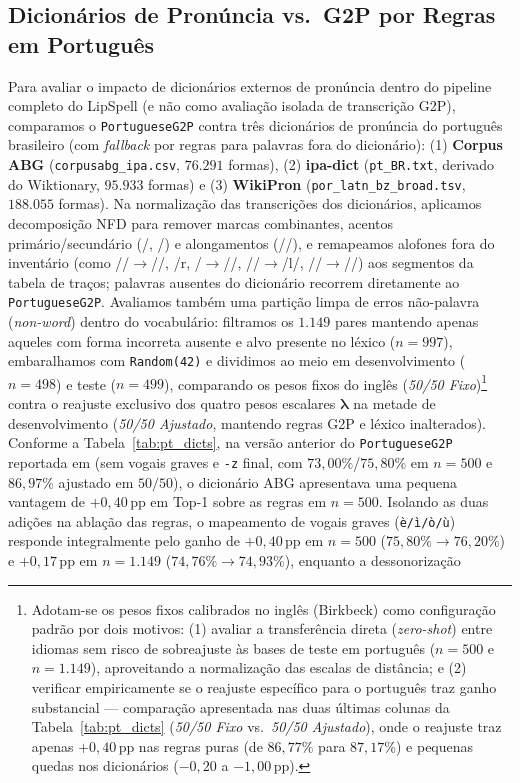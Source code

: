 \documentclass[a4paper, twocolumn, 11pt, twoside]{article}
\begin{document}
\subsection{Dicionários de Pronúncia vs.\ G2P por Regras em Português}
\label{sec:pt_dicts}
Para avaliar o impacto de dicionários externos de pronúncia dentro do pipeline completo do LipSpell (e não como avaliação isolada de transcrição G2P), comparamos o \texttt{PortugueseG2P} contra três dicionários de pronúncia do português brasileiro (com \textit{fallback} por regras para palavras fora do dicionário): (1) \textbf{Corpus ABG} \citep{benevides2017abg} (\texttt{corpusabg\_ipa.csv}, $76.291$ formas), (2) \textbf{ipa-dict} \citep{opendictipadict} (\texttt{pt\_BR.txt}, derivado do Wiktionary, $95.933$ formas) e (3) \textbf{WikiPron} \citep{lee2020wikipron} (\texttt{por\_latn\_bz\_broad.tsv}, $188.055$ formas). Na normalização das transcrições dos dicionários, aplicamos decomposição NFD para remover marcas combinantes, acentos primário/secundário (/\textprimstress, \textsecstress/) e alongamentos (/\textlengthmark/), e remapeamos alofones fora do inventário (como /\textinvscr/$\rightarrow$/\textturnr/, /r, /$\rightarrow$/\textfishhookr/, /\textltilde/$\rightarrow$/l/, /\textgamma/$\rightarrow$//) aos segmentos da tabela de traços; palavras ausentes do dicionário recorrem diretamente ao \texttt{PortugueseG2P}. Avaliamos também uma partição limpa de erros não-palavra (\textit{non-word}) dentro do vocabulário: filtramos os $1.149$ pares mantendo apenas aqueles com forma incorreta ausente e alvo presente no léxico ($n=997$), embaralhamos com \texttt{Random(42)} e dividimos ao meio em desenvolvimento ($n=498$) e teste ($n=499$), comparando os pesos fixos do inglês (\textit{50/50 Fixo})\footnote{Adotam-se os pesos fixos calibrados no inglês (Birkbeck) como configuração padrão por dois motivos: (1) avaliar a transferência direta (\textit{zero-shot}) entre idiomas sem risco de sobreajuste às bases de teste em português ($n=500$ e $n=1.149$), aproveitando a normalização das escalas de distância; e (2) verificar empiricamente se o reajuste específico para o português traz ganho substancial --- comparação apresentada nas duas últimas colunas da Tabela~\ref{tab:pt_dicts} (\textit{50/50 Fixo} vs.\ \textit{50/50 Ajustado}), onde o reajuste traz apenas $+0{,}40$\,pp nas regras puras (de $86{,}77\%$ para $87{,}17\%$) e pequenas quedas nos dicionários ($-0{,}20$ a $-1{,}00$\,pp).} contra o reajuste exclusivo dos quatro pesos escalares $\boldsymbol{\lambda}$ na metade de desenvolvimento (\textit{50/50 Ajustado}, mantendo regras G2P e léxico inalterados). Conforme a Tabela~\ref{tab:pt_dicts}, na versão anterior do \texttt{PortugueseG2P} reportada em \citet{araujo2026lipspell} (sem vogais graves e \texttt{-z} final, com $73{,}00\%$/$75{,}80\%$ em $n=500$ e $86{,}97\%$ ajustado em $50/50$), o dicionário ABG apresentava uma pequena vantagem de $+0{,}40$\,pp em Top-1 sobre as regras em $n=500$. Isolando as duas adições na ablação das regras, o mapeamento de vogais graves (\texttt{è/ì/ò/ù}) responde integralmente pelo ganho de $+0{,}40$\,pp em $n=500$ ($75{,}80\%\rightarrow 76{,}20\%$) e $+0{,}17$\,pp em $n=1.149$ ($74{,}76\%\rightarrow 74{,}93\%$), enquanto a dessonorização 
\end{document}
